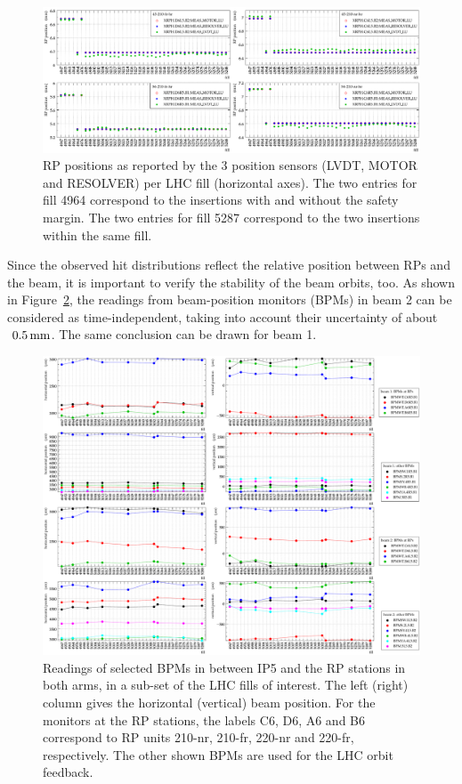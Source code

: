 \documentclass[TOTEM]{cern/cernphprep}
\def\un#1{\,{\rm #1}}
\begin{document}
\begin{figure}[h!]
\begin{center}
\includegraphics[width=1\hsize]{fig/conditions/rp_positions_rps.pdf}
\caption{%
RP positions as reported by the 3 position sensors (LVDT, MOTOR and RESOLVER) per LHC fill (horizontal axes). The two entries for fill 4964 correspond to the insertions with and without the safety margin. The two entries for fill 5287 correspond to the two insertions within the same fill.
}
\label{fig:cond_rp}
\end{center}
\end{figure}


Since the observed hit distributions reflect the relative position between RPs and the beam, it is important to verify the stability of the beam orbits, too. As shown in Figure~\ref{fig:cond_bpm}, the readings from beam-position monitors (BPMs) in beam 2 can be considered as time-independent, taking into account their uncertainty of about $~0.5\un{mm}$. The same conclusion can be drawn for beam 1.

\begin{figure}[h!]
\vskip-5mm
\begin{center}
\includegraphics[width=1\hsize]{fig/conditions/bpm_comparison.pdf}
\caption{%
Readings of selected BPMs in between IP5 and the RP stations in both arms, in a sub-set of the LHC fills of interest. The left (right) column gives the horizontal (vertical) beam position. For the monitors at the RP stations, the labels C6, D6, A6 and B6 correspond to RP units 210-nr, 210-fr, 220-nr and 220-fr, respectively. The other shown BPMs are used for the LHC orbit feedback.
}
\label{fig:cond_bpm}
\end{center}
\end{figure}
\end{document}
